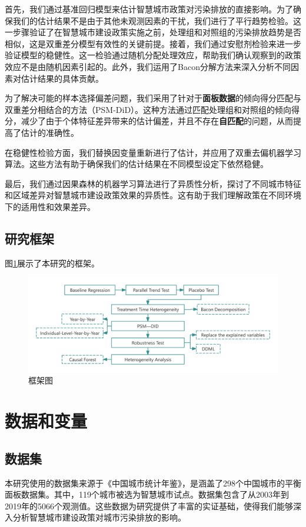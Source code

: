 \documentclass[a4paper,12pt]{article}
\begin{document}
首先，我们通过基准回归模型来估计智慧城市政策对污染排放的直接影响。为了确保我们的估计结果不是由于其他未观测因素的干扰，我们进行了平行趋势检验。这一步骤验证了在智慧城市建设政策实施之前，处理组和对照组的污染排放趋势是否相似，这是双重差分模型有效性的关键前提。接着，我们通过安慰剂检验来进一步验证模型的稳健性。这一检验通过随机分配处理效应，帮助我们确认观察到的政策效应不是由随机因素引起的。此外，我们运用了Bacon分解方法来深入分析不同因素对估计结果的具体贡献。

为了解决可能的样本选择偏差问题，我们采用了针对于\textbf{面板数据}的倾向得分匹配与双重差分相结合的方法（PSM-DiD）。这种方法通过匹配处理组和对照组的倾向得分，减少了由于个体特征差异带来的估计偏差，并且不存在\textbf{自匹配}的问题，从而提高了估计的准确性。

在稳健性检验方面，我们替换因变量重新进行了估计，并应用了双重去偏机器学习算法。这些方法有助于确保我们的估计结果在不同模型设定下依然稳健。

最后，我们通过因果森林的机器学习算法进行了异质性分析，探讨了不同城市特征和区域差异对智慧城市建设政策效果的异质性。这有助于我们理解政策在不同环境下的适用性和效果差异。


\subsection{研究框架}

图\ref{fig:frame}展示了本研究的框架。

\begin{figure}[H]
    \centering
    \includegraphics[width=\textwidth]{framework.jpg}
    \caption{框架图}
    \label{fig:frame}  
\end{figure}


\section{数据和变量}

\subsection{数据集}
本研究使用的数据集来源于《中国城市统计年鉴》，是涵盖了298个中国城市的平衡面板数据集。其中，119个城市被选为智慧城市试点。数据集包含了从2003年到2019年的5066个观测值。这些数据为研究提供了丰富的实证基础，使得我们能够深入分析智慧城市建设政策对城市污染排放的影响。
\end{document}
